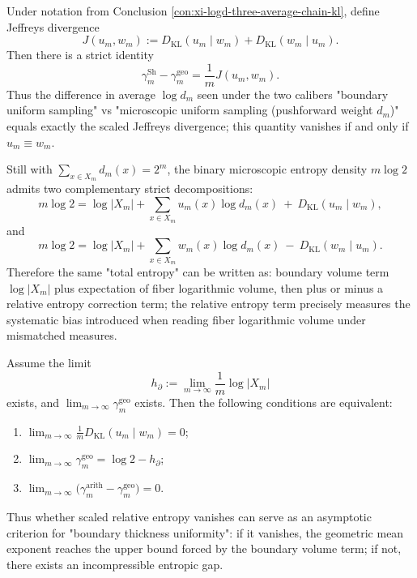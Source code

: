 \begin{conclusion}\label{con:xi-jeffreys-logd-gap-certificate}
Under notation from Conclusion \ref{con:xi-logd-three-average-chain-kl}, define Jeffreys divergence
\[
J(u_m,w_m):=D_{\mathrm{KL}}(u_m\mid w_m)+D_{\mathrm{KL}}(w_m\mid u_m).
\]
Then there is a strict identity
\[
\gamma_m^{\mathrm{Sh}}-\gamma_m^{\mathrm{geo}}=\frac{1}{m}J(u_m,w_m).
\]
Thus the difference in average \(\log d_m\) seen under the two calibers "boundary uniform sampling" vs "microscopic uniform sampling (pushforward weight \(d_m\))" equals exactly the scaled Jeffreys divergence;
this quantity vanishes if and only if \(u_m\equiv w_m\).
\end{conclusion}

\begin{conclusion}\label{con:xi-micro-entropy-holographic-two-splits}
Still with \(\sum_{x\in X_m} d_m(x)=2^m\), the binary microscopic entropy density \(m\log 2\) admits two complementary strict decompositions:
\[
m\log 2
=\log|X_m|
+\sum_{x\in X_m}u_m(x)\log d_m(x)\ +\ D_{\mathrm{KL}}(u_m\mid w_m),
\]
and
\[
m\log 2
=\log|X_m|
+\sum_{x\in X_m}w_m(x)\log d_m(x)\ -\ D_{\mathrm{KL}}(w_m\mid u_m).
\]
Therefore the same "total entropy" can be written as: boundary volume term \(\log|X_m|\) plus expectation of fiber logarithmic volume, then plus or minus a relative entropy correction term;
the relative entropy term precisely measures the systematic bias introduced when reading fiber logarithmic volume under mismatched measures.
\end{conclusion}

\begin{conclusion}\label{con:xi-equimultiplicity-kl-vanishing}
Assume the limit
\[
h_\partial:=\lim_{m\to\infty}\frac{1}{m}\log|X_m|
\]
exists, and \(\lim_{m\to\infty}\gamma_m^{\mathrm{geo}}\) exists.
Then the following conditions are equivalent:
\begin{enumerate}
  \item \(\displaystyle \lim_{m\to\infty}\frac{1}{m}D_{\mathrm{KL}}(u_m\mid w_m)=0\);
  \item \(\displaystyle \lim_{m\to\infty}\gamma_m^{\mathrm{geo}}=\log 2-h_\partial\);
  \item \(\displaystyle \lim_{m\to\infty}\bigl(\gamma_m^{\mathrm{arith}}-\gamma_m^{\mathrm{geo}}\bigr)=0\).
\end{enumerate}
Thus whether scaled relative entropy vanishes can serve as an asymptotic criterion for "boundary thickness uniformity": if it vanishes, the geometric mean exponent reaches the upper bound forced by the boundary volume term; if not, there exists an incompressible entropic gap.
\end{conclusion}

